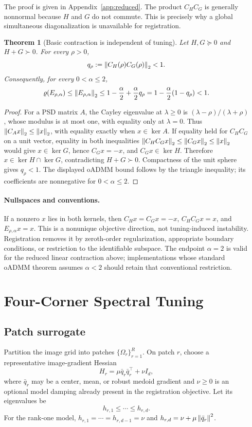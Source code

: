 \documentclass[pdflatex,iicol,sn-mathphys-num]{sn-jnl}
\newtheorem{theorem}{Theorem}[section]
\theoremstyle{definition}\newtheorem{definition}[theorem]{Definition}\newtheorem{remark}[theorem]{Remark}
\begin{document}
The proof is given in Appendix~\ref{app:reduced}. The product $C_HC_G$ is generally nonnormal because $H$ and $G$ do not commute. This is precisely why a global simultaneous diagonalization is unavailable for registration.

\begin{theorem}[Basic contraction is independent of tuning]\label{thm:basic-contraction}
Let $H,G\succeq0$ and $H+G\succ0$. For every $\rho>0$,
\[
q_\rho:=\left\lVert C_H(\rho)C_G(\rho)\right\rVert_2<1.
\]
Consequently, for every $0<\alpha\le2$,
\[
\varrho(E_{\rho,\alpha})\le\left\lVert E_{\rho,\alpha}\right\rVert_2
\le1-\frac\alpha2+\frac\alpha2q_\rho
=1-\frac\alpha2(1-q_\rho)<1.
\]
\end{theorem}
\begin{proof}
For a PSD matrix $A$, the Cayley eigenvalue at $\lambda\ge0$ is
$(\lambda-\rho)/(\lambda+\rho)$, whose modulus is at most one, with equality
only at $\lambda=0$. Thus $\left\lVert C_Ax\right\rVert_2\le\left\lVert x\right\rVert_2$, with equality exactly
when $x\in\ker A$. If equality held for $C_HC_G$ on a unit vector, equality
in both inequalities $\left\lVert C_HC_Gx\right\rVert_2\le\left\lVert C_Gx\right\rVert_2\le\left\lVert x\right\rVert_2$ would give
$x\in\ker G$, hence $C_Gx=-x$, and $C_Gx\in\ker H$. Therefore
$x\in\ker H\cap\ker G$, contradicting $H+G\succ0$. Compactness of the unit
sphere gives $q_\rho<1$. The displayed oADMM bound follows by the triangle
inequality; its coefficients are nonnegative for $0<\alpha\le2$.
\end{proof}

\paragraph{Nullspaces and conventions.} If a nonzero $x$ lies in both kernels,
then $C_Hx=C_Gx=-x$, $C_HC_Gx=x$, and $E_{\rho,\alpha}x=x$. This is a nonunique
objective direction, not tuning-induced instability. Registration removes it by
zeroth-order regularization, appropriate boundary conditions, or restriction to
the identifiable subspace. The endpoint $\alpha=2$ is valid for the reduced
linear contraction above; implementations whose standard oADMM theorem assumes
$\alpha<2$ should retain that conventional restriction.

\section{Four-Corner Spectral Tuning}
\subsection{Patch surrogate}
Partition the image grid into patches $\{\Omega_r\}_{r=1}^{R}$. On patch $r$, choose a representative image-gradient Hessian
\begin{equation}
H_r=\mu\bar q_r\bar q_r^\top+\nu I_d,
\label{eq:Hr}
\end{equation}
where $\bar q_r$ may be a center, mean, or robust medoid gradient and $\nu\ge0$ is an optional model damping already present in the registration objective. Let its eigenvalues be
\[
h_{r,1}\le\cdots\le h_{r,d}.
\]
For the rank-one model, $h_{r,1}=\cdots=h_{r,d-1}=\nu$ and $h_{r,d}=\nu+\mu\left\lVert \bar q_r\right\rVert^2$.
\end{document}
